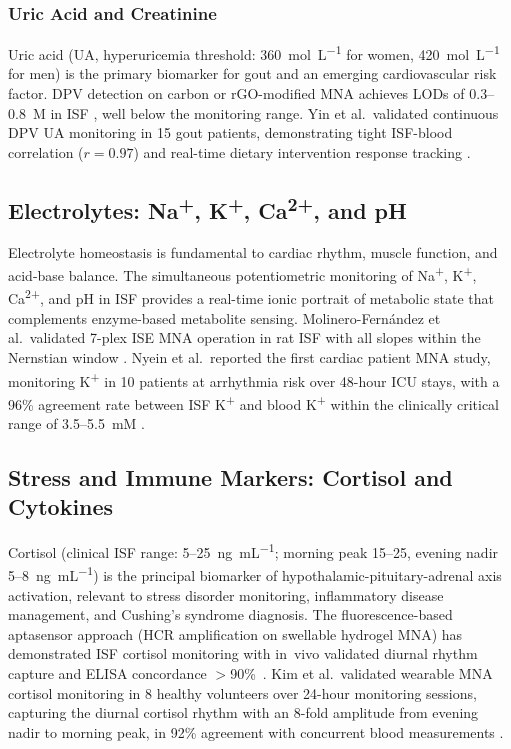 \documentclass[review,1p]{elsarticle}
\begin{document}
\subsubsection{Uric Acid and Creatinine}

Uric acid (UA, hyperuricemia threshold: 360~\textmu{}mol~L\textsuperscript{$-1$} for women, 420~\textmu{}mol~L\textsuperscript{$-1$} for men) is the primary biomarker for gout and an emerging cardiovascular risk factor. DPV detection on carbon or rGO-modified MNA achieves LODs of 0.3--0.8~\textmu{}M in ISF \cite{Zhu2022UA, Wang2023rGO, Yin2023UA}, well below the monitoring range. Yin et al.\ validated continuous DPV UA monitoring in 15 gout patients, demonstrating tight ISF-blood correlation ($r = 0.97$) and real-time dietary intervention response tracking \cite{Yin2023UA}.

\subsection{Electrolytes: Na\textsuperscript{+}, K\textsuperscript{+}, Ca\textsuperscript{2+}, and pH}
\label{subsec:electrolytes}

Electrolyte homeostasis is fundamental to cardiac rhythm, muscle function, and acid-base balance. The simultaneous potentiometric monitoring of Na\textsuperscript{+}, K\textsuperscript{+}, Ca\textsuperscript{2+}, and pH in ISF provides a real-time ionic portrait of metabolic state that complements enzyme-based metabolite sensing. Molinero-Fern\'{a}ndez et al.\ validated 7-plex ISE MNA operation in rat ISF with all slopes within the Nernstian window \cite{MolineroFernandez2023}. Nyein et al.\ reported the first cardiac patient MNA study, monitoring K\textsuperscript{+} in 10 patients at arrhythmia risk over 48-hour ICU stays, with a 96\% agreement rate between ISF K\textsuperscript{+} and blood K\textsuperscript{+} within the clinically critical range of 3.5--5.5~mM \cite{Nyein2024Cardiac}.

\subsection{Stress and Immune Markers: Cortisol and Cytokines}
\label{subsec:stress}

Cortisol (clinical ISF range: 5--25~ng~mL\textsuperscript{$-1$}; morning peak 15--25, evening nadir 5--8~ng~mL\textsuperscript{$-1$}) is the principal biomarker of hypothalamic-pituitary-adrenal axis activation, relevant to stress disorder monitoring, inflammatory disease management, and Cushing's syndrome diagnosis. The fluorescence-based aptasensor approach (HCR amplification on swellable hydrogel MNA) has demonstrated ISF cortisol monitoring with in~vivo validated diurnal rhythm capture and ELISA concordance $>$90\%~\cite{Zhou2025Cortisol}. Kim et al.\ validated wearable MNA cortisol monitoring in 8 healthy volunteers over 24-hour monitoring sessions, capturing the diurnal cortisol rhythm with an 8-fold amplitude from evening nadir to morning peak, in 92\% agreement with concurrent blood measurements \cite{Kim2024Cortisol}.
\end{document}
